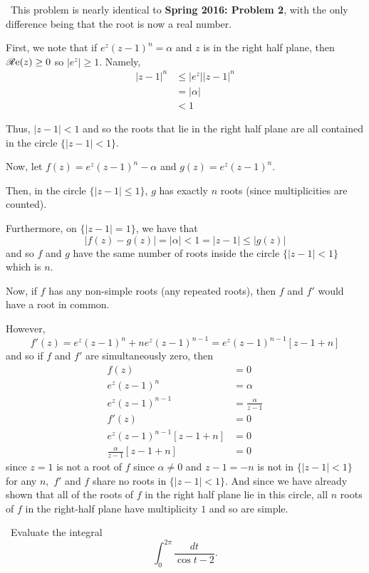\documentclass[12pt]{Qual}
\begin{document}
\begin{solution}$\,$
This problem is nearly identical to \textbf{Spring 2016: Problem 2}, with the only difference being that the root is now a real number.

First, we note that if $e^z(z-1)^n=\alpha$ and $z$ is in the right half plane, then $\mathscr{R}\text{e}(z)\ge0$ so $|e^z|\ge1$. Namely, \begin{align*}
    |z-1|^n&\le|e^z||z-1|^n\\
    &=|\alpha|\\
    &<1
\end{align*}

Thus, $|z-1|<1$ and so the roots that lie in the right half plane are all contained in the circle $\{|z-1|<1\}.$

Now, let $f(z)=e^z(z-1)^n-\alpha$ and $g(z)=e^z(z-1)^n$.

Then, in the circle $\{|z-1|\le 1\}$, $g$ has exactly $n$ roots (since multiplicities are counted).

Furthermore, on $\{|z-1|=1\}$, we have that $$|f(z)-g(z)|=|\alpha|<1=|z-1|\le|g(z)|$$ and so $f$ and $g$ have the same number of roots inside the circle $\{|z-1|<1\}$ which is $n.$

Now, if $f$ has any non-simple roots (any repeated roots), then $f$ and $f'$ would have a root in common.

However, $$f'(z)=e^z(z-1)^n+ne^z(z-1)^{n-1}=e^z(z-1)^{n-1}[z-1+n]$$ and so if $f$ and $f'$ are simultaneously zero, then \begin{align*}
    f(z)&=0\\
    e^z(z-1)^n&=\alpha\\
    e^z(z-1)^{n-1}&=\frac{\alpha}{z-1}\\
    f'(z)&=0\\
    e^z(z-1)^{n-1}[z-1+n]&=0\\
    \frac{\alpha}{z-1}[z-1+n]&=0
\end{align*} since $z=1$ is not a root of $f$ since $\alpha\not=0$ and $z-1=-n$ is not in $\{|z-1|<1\}$ for any $n,$ $f'$ and $f$ share no roots in $\{|z-1|<1\}$. And since we have already shown that all of the roots of $f$ in the right half plane lie in this circle, all $n$ roots of $f$ in the right-half plane have multiplicity $1$ and so are simple.
\end{solution}
\newpage




\begin{problem} $\,$
Evaluate the integral $$\int_0^{2\pi}\frac{dt}{\cos t-2}.$$
\end{problem}
\end{document}
